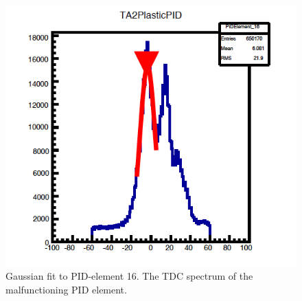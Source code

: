 \begin{figure}[H]
\begin{center}
\includegraphics[scale=0.4]{pidtdcgaus16.png}
\caption{Gaussian fit to PID-element 16. The TDC spectrum of the malfunctioning PID element.}
\label{pidtdcgaus16}
\end{center}
\end{figure}



